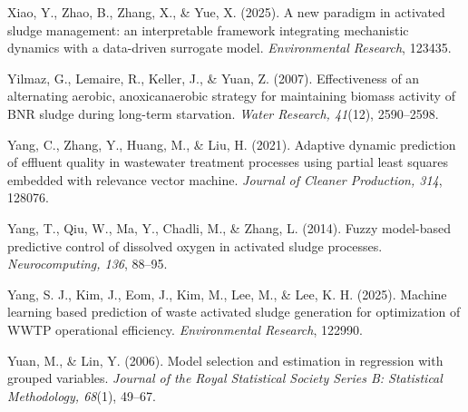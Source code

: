 \documentclass[a4paper,fleqn]{cas-sc}
\begin{document}
\noindent Xiao, Y., Zhao, B., Zhang, X., \& Yue, X. (2025). A new paradigm in activated sludge management: an interpretable framework integrating mechanistic dynamics with a data-driven surrogate model. \textit{Environmental Research}, 123435.

\noindent Yilmaz, G., Lemaire, R., Keller, J., \& Yuan, Z. (2007). Effectiveness of an alternating aerobic, anoxic\/anaerobic strategy for maintaining biomass activity of BNR sludge during long-term starvation. \textit{Water Research, 41}(12), 2590--2598.

\noindent Yang, C., Zhang, Y., Huang, M., \& Liu, H. (2021). Adaptive dynamic prediction of effluent quality in wastewater treatment processes using partial least squares embedded with relevance vector machine. \textit{Journal of Cleaner Production, 314}, 128076.

\noindent Yang, T., Qiu, W., Ma, Y., Chadli, M., \& Zhang, L. (2014). Fuzzy model-based predictive control of dissolved oxygen in activated sludge processes. \textit{Neurocomputing, 136}, 88--95.

\noindent Yang, S. J., Kim, J., Eom, J., Kim, M., Lee, M., \& Lee, K. H. (2025). Machine learning based prediction of waste activated sludge generation for optimization of WWTP operational efficiency. \textit{Environmental Research}, 122990.

\noindent Yuan, M., \& Lin, Y. (2006). Model selection and estimation in regression with grouped variables. \textit{Journal of the Royal Statistical Society Series B: Statistical Methodology, 68}(1), 49--67.
\end{document}

